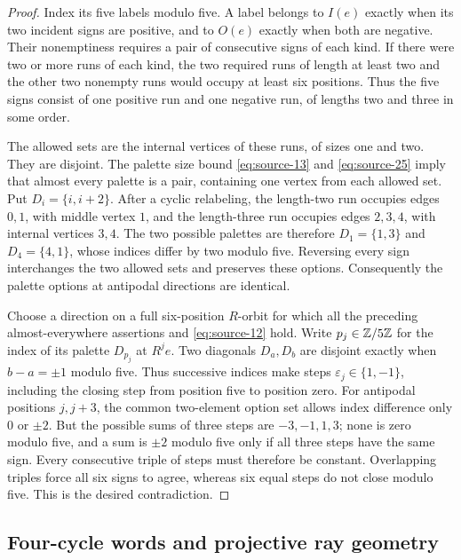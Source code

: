 \begin{proof}
Index its five labels modulo five.  A label belongs to \(I(e)\)
exactly when its two incident signs are positive, and to \(O(e)\)
exactly when both are negative.  Their nonemptiness requires a
pair of consecutive signs of each kind.  If there were two or
more runs of each kind, the two required runs of length at least
two and the other two nonempty runs would occupy at least six
positions.  Thus the five signs consist of one positive run and
one negative run, of lengths two and three in some order.

The allowed sets are the internal vertices of these runs, of
sizes one and two.  They are disjoint.  The palette size bound
\eqref{eq:source-13} and \eqref{eq:source-25} imply that almost
every palette is a pair, containing one vertex from each allowed
set.  Put \(D_i=\{i,i+2\}\).  After a cyclic relabeling, the
length-two run occupies edges \(0,1\), with middle vertex \(1\),
and the length-three run occupies edges \(2,3,4\), with internal
vertices \(3,4\).  The two possible palettes are therefore
\(D_1=\{1,3\}\) and \(D_4=\{4,1\}\), whose indices differ by
two modulo five.  Reversing every sign interchanges the two
allowed sets and preserves these options.  Consequently the
palette options at antipodal directions are identical.

Choose a direction on a full six-position \(R\)-orbit for which
all the preceding almost-everywhere assertions and
\eqref{eq:source-12} hold.  Write \(p_j\in\mathbb Z/5\mathbb Z\) for the
index of its palette \(D_{p_j}\) at \(R^je\).  Two diagonals
\(D_a,D_b\) are disjoint exactly when \(b-a=\pm1\) modulo five.
Thus successive indices make steps \(\varepsilon_j\in\{1,-1\}\),
including the closing step from position five to position zero.
For antipodal positions \(j,j+3\), the common two-element option
set allows index difference only \(0\) or \(\pm2\).
But the possible sums of three steps are \(-3,-1,1,3\); none
is zero modulo five, and a sum is \(\pm2\) modulo five only if
all three steps have the same sign.  Every consecutive triple
of steps must therefore be constant.  Overlapping triples force
all six signs to agree, whereas six equal steps do not close
modulo five.  This is the desired contradiction.
\end{proof}

\subsection{Four-cycle words and projective ray geometry}

